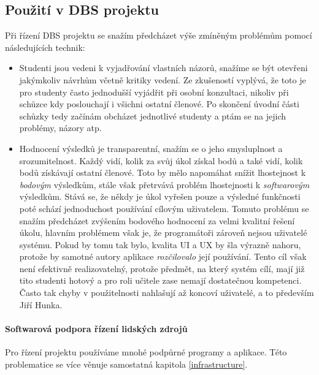 \subsection{Použití v DBS projektu} \label{DBSmanagement:meeting}
Při řízení DBS projektu se snažím předcházet výše zmíněným problémům pomocí následujících technik:
\begin{itemize}
	\item Studenti jsou vedeni k vyjadřování vlastních názorů, snažíme se být otevřeni jakýmkoliv návrhům včetně kritiky vedení. Ze zkušeností vyplývá, že toto je pro studenty často jednodušší vyjádřit při osobní konzultaci, nikoliv při schůzce kdy poslouchají i všichni ostatní členové. Po skončení úvodní  části schůzky tedy začínám obcházet jednotlivé studenty a ptám se na jejich problémy, názory atp.
	\item Hodnocení výsledků je transparentní, snažím se o jeho smysluplnost a srozumitelnost. Každý vidí, kolik za svůj úkol získal bodů a také vidí, kolik bodů získávají ostatní členové. Toto by mělo napomáhat snížit lhostejnost k \emph{bodovým} výsledkům, stále však přetrvává problém lhostejnosti k \emph{softwarovým} výsledkům. Stává se, že někdy je úkol vyřešen pouze  a výsledné funkčnosti poté schází jednoduchost používání cílovým uživatelem. Tomuto problému se snažím předcházet zvýšením bodového hodnocení za velmi kvalitní řešení úkolu, hlavním problémem však je, že programátoři zároveň nejsou uživatelé systému. Pokud by tomu tak bylo, kvalita UI a UX by šla výrazně nahoru, protože by samotné autory aplikace \emph{rozčilovalo} její používání. Tento cíl však není efektivně realizovatelný, protože předmět, na který systém cílí, mají již tito studenti hotový a pro roli učitele zase nemají dostatečnou kompetenci. Často tak chyby v použitelnosti nahlašují až koncoví uživatelé, a to především Jiří Hunka.
\end{itemize}



\paragraph{Softwarová podpora řízení lidských zdrojů}

Pro řízení projektu používáme mnohé podpůrné programy a aplikace. Této problematice se více věnuje samostatná kapitola \ref{infrastructure}.
